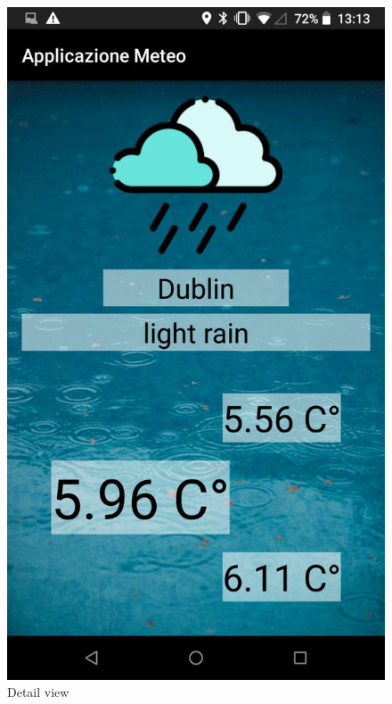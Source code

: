 \documentclass{article}
\begin{document}
\begin{figure}[!htb]
      \includegraphics[width=\linewidth]{images/sc4.jpg}
      \caption{Detail view}\label{fig:awesome_image3}
    \endminipage\hfill

\end{figure}
\end{document}
